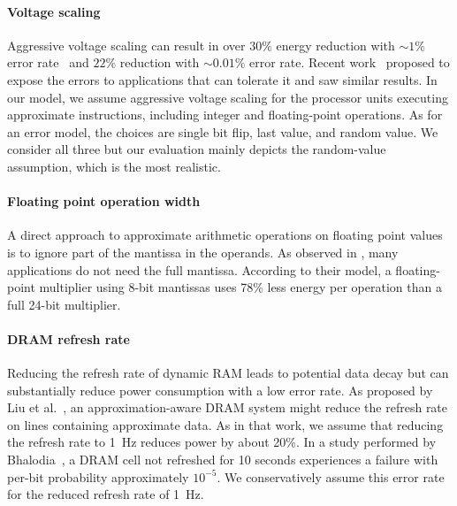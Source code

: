 \paragraph{Voltage scaling} Aggressive voltage
scaling can result in over $30\%$ energy reduction with
$\sim \! 1\%$ error rate~\cite{razor} and $22\%$ reduction with
$\sim \! 0.01\%$ error rate.  Recent work~\cite{relax} proposed to
expose the errors to applications that can tolerate it and saw similar
results. In our model, we assume aggressive voltage scaling for the
processor units executing approximate instructions,
including integer and floating-point operations. As for an
error model, the choices are single bit flip, last value, and random
value. We consider all three but our evaluation mainly depicts the
random-value assumption, which is the most realistic.

\paragraph{Floating point operation width}
A direct approach to approximate arithmetic operations on floating point values
is to ignore part of the mantissa in the operands. As observed in
\cite{bitwidthred}, many applications do not need the full mantissa.
According to their model,
a floating-point multiplier using 8-bit mantissas uses 78\% less
energy per operation than a full 24-bit multiplier.




\paragraph{DRAM refresh rate}
Reducing the refresh rate of dynamic RAM leads to potential data decay
but can substantially reduce power consumption with a low error rate.
As proposed by Liu et al.~\cite{flikker}, an approximation-aware DRAM system
might reduce the refresh rate on lines containing approximate data. As in
that work, we assume that reducing the refresh rate to 1~Hz
reduces power by about 20\%.
In a study performed by Bhalodia~\cite{dramthesis}, a DRAM cell not
refreshed for 10 seconds experiences a failure with per-bit
probability approximately $10^{-5}$. We conservatively assume this error
rate for the reduced refresh rate of 1~Hz.

